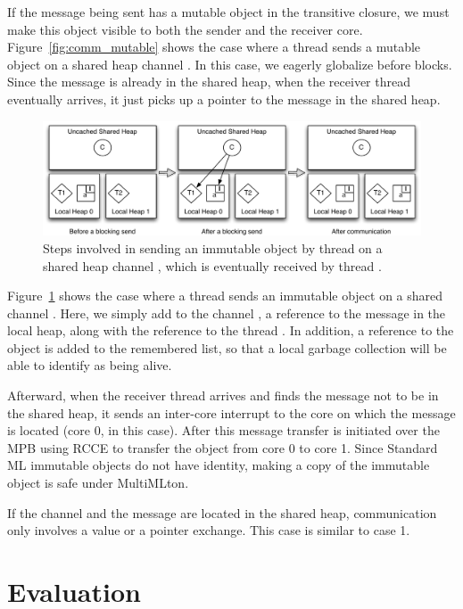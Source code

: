 If the message being sent has a mutable object in the transitive closure, we
must make this object visible to both the sender and the receiver core.
Figure~\ref{fig:comm_mutable} shows the case where a thread  sends a
mutable object  on a shared heap channel . In this case, we eagerly
globalize  before  blocks. Since the message is already in the
shared heap, when the receiver thread  eventually arrives, it just picks
up a pointer to the message in the shared heap.

\begin{figure}[t]
\centering
\includegraphics[width=1\textwidth]{Figures/Comm_Case_4}
\caption{Steps involved in sending an immutable object  by thread 
on a shared heap channel , which is eventually received by thread
.}
\label{fig:comm_immutable}
\end{figure}

Figure~\ref{fig:comm_immutable} shows the case where a thread  sends an
immutable object  on a shared channel . Here, we simply add to the
channel , a reference to the message  in the local heap, along with
the reference to the thread . In addition, a reference to the object
 is added to the remembered list, so that a local garbage collection will
be able to identify  as being alive.

Afterward, when the receiver thread  arrives and finds the message not to
be in the shared heap, it sends an inter-core interrupt to the core on which the
message is located (core 0, in this case). After this message transfer is
initiated over the MPB using RCCE to transfer the object  from core 0 to
core 1. Since Standard ML immutable objects do not have identity, making a copy
of the immutable object is safe under MultiMLton.

If the channel and the message are located in the shared heap, communication
only involves a value or a pointer exchange. This case is similar to case 1.

\section{Evaluation}
\label{sec:gc_bench}

